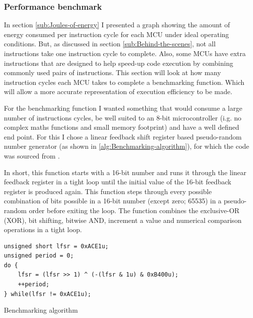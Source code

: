 \subsubsection*{Performance benchmark}

In section \ref{sub:Joules-of-energy} I presented a graph showing
the amount of energy consumed per instruction cycle for each MCU under
ideal operating conditions. But, as discussed in section \ref{sub:Behind-the-scenes},
not all instructions take one instruction cycle to complete. Also,
some MCUs have extra instructions that are designed to help speed-up
code execution by combining commonly used pairs of instructions. This
section will look at how many instruction cycles each MCU takes to
complete a benchmarking function. Which will allow a more accurate
representation of execution efficiency to be made.

For the benchmarking function I wanted something that would consume
a large number of instructions cycles, be well suited to an 8-bit
microcontroller (i.g. no complex maths functions and small memory
footprint) and have a well defined end point. For this I chose a linear
feedback shift register based pseudo-random number generator (as shown
in \ref{alg:Benchmarking-algorithm}), for which the code was sourced
from \cite{LinearFeedbackRegister}.

In short, this function starts with a 16-bit number and runs it through
the linear feedback register in a tight loop until the initial value
of the 16-bit feedback register is produced again. This function steps
through every possible combination of bits possible in a 16-bit number
(except zero; 65535) in a pseudo-random order before exiting the loop.
The function combines the exclusive-OR (XOR), bit shifting, bitwise
AND, increment a value and numerical comparison operations in a tight
loop.

\begin{algorithm}
\begin{lstlisting}
unsigned short lfsr = 0xACE1u;
unsigned period = 0;
do {
	lfsr = (lfsr >> 1) ^ (-(lfsr & 1u) & 0xB400u);
	++period;
} while(lfsr != 0xACE1u);
\end{lstlisting}
\caption{\label{alg:Benchmarking-algorithm}Benchmarking algorithm}
\end{algorithm}


